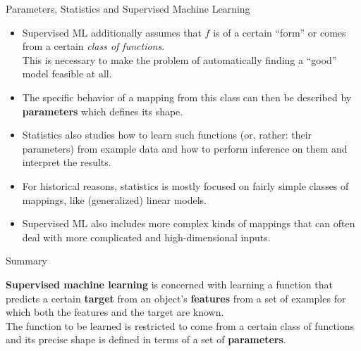 \documentclass[11pt,compress,t,notes=noshow, xcolor=table]{beamer}
\begin{document}
\begin{vbframe}{Parameters, Statistics and Supervised Machine Learning}

\begin{itemize}
\item Supervised ML additionally assumes that $f$ is of a certain \enquote{form}
or comes from a certain \emph{class of functions}.\\
This is necessary to make the problem of automatically finding a \enquote{good} model feasible at all.
\item The specific behavior of a mapping from this class can then be described by \textbf{parameters} which defines its shape.
\item Statistics also studies how to learn such functions (or, rather: their parameters) from example data and how to perform inference on them and interpret the results.
\item For historical reasons, statistics is mostly focused on fairly simple classes of mappings, like (generalized) linear models.
\item Supervised ML also includes more complex kinds of mappings that can often deal with more complicated and high-dimensional inputs.
\end{itemize}
\end{vbframe}


\begin{frame}{Summary}

\textbf{Supervised machine learning} is concerned with learning a function that
predicts a certain \textbf{target} from an object's \textbf{features} from a
set of examples for which both the features and the target are known.\\
The function to be learned is restricted to come from a certain class of functions
and its precise shape is defined in terms of a set of \textbf{parameters}.

\end{frame}


\endlecture
\end{document}
